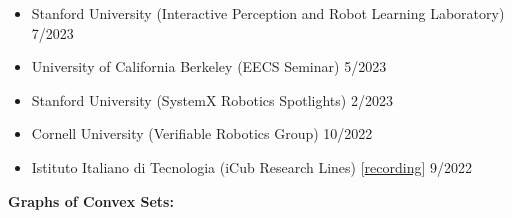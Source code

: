 \documentclass[11pt,a4paper,sans]{moderncv}
\begin{document}
\begin{itemize}

\item Stanford University (Interactive Perception and Robot Learning Laboratory) \hfill 7/2023
\item University of California Berkeley (EECS Seminar) \hfill 5/2023
\item Stanford University (SystemX Robotics Spotlights) \hfill 2/2023
\item Cornell University (Verifiable Robotics Group) \hfill 10/2022
\item  Istituto Italiano di Tecnologia (iCub Research Lines) [\href{https://www.youtube.com/watch?v=FoqAAgqgn-o}{\color{orange}recording}] \hfill 9/2022

\end{itemize}

\vspace{5pt}

\textbf{Graphs of Convex Sets:}

\vspace{5pt}
\end{document}
